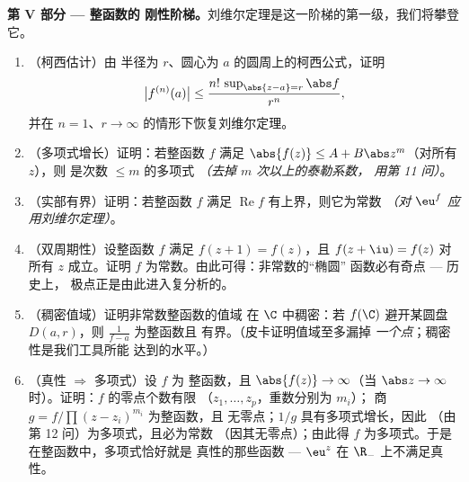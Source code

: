 \begin{problem}
\medskip
\noindent\textbf{第 V 部分 --- 整函数的
刚性阶梯。}刘维尔定理是这一阶梯的第一级，我们将攀登
它。
\begin{enumerate}[resume]
  \item （柯西估计）由
        半径为 $r$、圆心为 $a$ 的圆周上的柯西公式，证明
        \[
        \bigl|f^{(n)}(a)\bigr| \leq
        \frac{n!\,\sup_{\abs{z-a}=r}\abs f}{r^n} ,
        \]
        并在 $n = 1$、$r \to
        \infty$ 的情形下恢复刘维尔定理。
  \item （多项式增长）证明：若整函数 $f$
        满足 $\abs{f(z)} \leq A + B\abs z^m$（对所有 $z$），则
        是次数 $\leq m$ 的多项式 \emph{（去掉 $m$ 次以上的泰勒系数，
        用第 11 问）}。
  \item （实部有界）证明：若整函数 $f$
        满足 $\operatorname{Re}f$ 有上界，则它为常数
        \emph{（对 $\eu^{f}$ 应用刘维尔定理）}。
  \item （双周期性）设整函数 $f$ 满足 $f(z + 1)
        = f(z)$，且 $f(z + \iu) = f(z)$ 对所有 $z$ 成立。证明 $f$
        为常数。由此可得：非常数的“椭圆”
        函数必有奇点 --- 历史上，
        极点正是由此进入复分析的。
  \item （稠密值域）证明非常数整函数的值域
        在 $\C$ 中稠密：若 $f(\C)$ 避开某圆盘
        $D(a, r)$，则 $\frac1{f - a}$ 为整函数且
        有界。（皮卡证明值域至多漏掉
        \emph{一个点}；稠密性是我们工具所能
        达到的水平。）
  \item （真性 $\Rightarrow$ 多项式）设 $f$ 为
        整函数，且 $\abs{f(z)} \to \infty$（当 $\abs z \to
        \infty$ 时）。证明：$f$ 的零点个数有限
        （$z_1, \dots, z_p$，重数分别为 $m_i$）；
        商 $g = f/\prod(z - z_i)^{m_i}$ 为整函数，且
        无零点；$1/g$ 具有多项式增长，因此
        （由第 12 问）为多项式，且必为常数
        （因其无零点）；由此得 $f$ 为多项式。于是
        在整函数中，多项式恰好就是
        真性的那些函数 --- $\eu^z$ 在
        $\R_-$ 上不满足真性。
\end{enumerate}


\end{problem}
